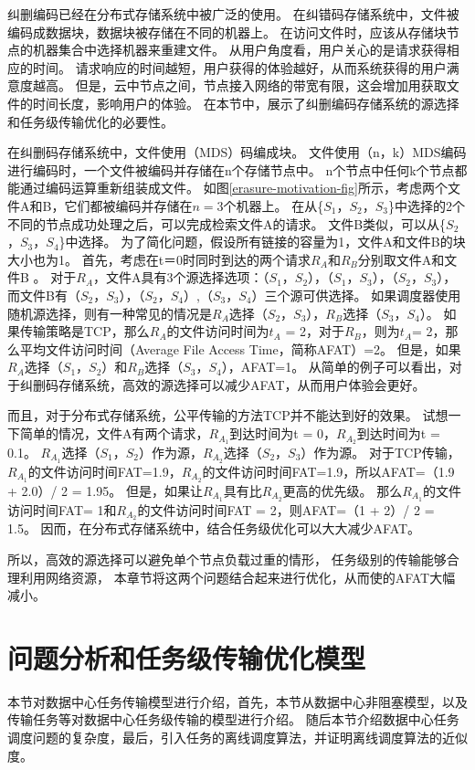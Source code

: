 纠删编码已经在分布式存储系统中被广泛的使用。
在纠错码存储系统中，文件被编码成数据块，数据块被存储在不同的机器上。
在访问文件时，应该从存储块节点的机器集合中选择机器来重建文件。
从用户角度看，用户关心的是请求获得相应的时间。
请求响应的时间越短，用户获得的体验越好，从而系统获得的用户满意度越高。
但是，云中节点之间，节点接入网络的带宽有限，这会增加用获取文件的时间长度，影响用户的体验。
在本节中，展示了纠删编码存储系统的源选择和任务级传输优化的必要性。


在纠删码存储系统中，文件使用（MDS）码编成块。
文件使用（n，k）MDS编码进行编码时，一个文件被编码并存储在n个存储节点中。
n个节点中任何k个节点都能通过编码运算重新组装成文件。
如图\ref{erasure-motivation-fig}所示，考虑两个文件A和B，它们都被编码并存储在$n = 3$个机器上。
在从\{$S_1$，$S_2$，$S_3$\}中选择的2个不同的节点成功处理之后，可以完成检索文件A的请求。
文件B类似，可以从\{$S_2$，$S_3$，$S_4$\}中选择。
为了简化问题，假设所有链接的容量为1，文件A和文件B的块大小也为1。
首先，考虑在t＝0时同时到达的两个请求$R_A$和$R_B$分别取文件A和文件B 。
对于$R_A$，文件A具有3个源选择选项：（$S_1$，$S_2$），（$S_1$，$S_3$），（$S_2$，$S_3$），
而文件B有（$S_2$，$S_3$），（$S_2$，$S_4$）,（$S_3$，$S_4$）三个源可供选择。
如果调度器使用随机源选择，则有一种常见的情况是$R_A$选择（$S_2$，$S_3$），$R_B$选择（$S_3$，$S_4$）。
如果传输策略是TCP，那么$R_A$的文件访问时间为$t_A$ = 2，对于$R_B$，则为$t_A$= 2，那么平均文件访问时间（Average File Access Time，简称AFAT）=2。
但是，如果$R_A$选择（$S_1$，$S_2$）和$R_B$选择（$S_3$，$S_4$），AFAT=1。
从简单的例子可以看出，对于纠删码存储系统，高效的源选择可以减少AFAT，从而用户体验会更好。

而且，对于分布式存储系统，公平传输的方法TCP并不能达到好的效果。
试想一下简单的情况，文件A有两个请求，$R_{A_1}$到达时间为t = 0，$R_{A_2}$到达时间为t = 0.1。 
$R_{A_1}$选择（$S_1$，$S_2$）作为源，$R_{A_2}$选择（$S_2$，$S_3$）作为源。
对于TCP传输，$R_{A_1}$的文件访问时间FAT=1.9，$R_{A_2}$的文件访问时间FAT=1.9，所以AFAT=（1.9 + 2.0）/ 2 = 1.95。
但是，如果让$R_{A_1}$具有比$R_{A_2}$更高的优先级。
那么$R_{A_1}$的文件访问时间FAT= 1和$R_{A_2}$的文件访问时间FAT = 2，则AFAT=（1 + 2）/ 2 = 1.5。
因而，在分布式存储系统中，结合任务级优化可以大大减少AFAT。

所以，高效的源选择可以避免单个节点负载过重的情形，
任务级别的传输能够合理利用网络资源，
本章节将这两个问题结合起来进行优化，从而使的AFAT大幅减小。



\section{问题分析和任务级传输优化模型}
\label{erasure_coding:networkmodel}
本节对数据中心任务传输模型进行介绍，首先，本节从数据中心非阻塞模型，以及传输任务等对数据中心任务级传输的模型进行介绍。
随后本节介绍数据中心任务调度问题的复杂度，最后，引入任务的离线调度算法，并证明离线调度算法的近似度。

